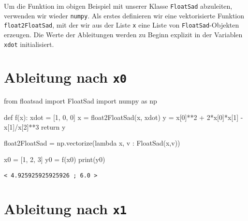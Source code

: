 \documentclass[
  a4paper,
  DIV=11]{scrreprt}
\newenvironment{Shaded}{\begin{snugshade}}{\end{snugshade}}
\newcommand{\BuiltInTok}[1]{\textcolor[rgb]{0.00,0.23,0.31}{#1}}
\newcommand{\ControlFlowTok}[1]{\textcolor[rgb]{0.00,0.23,0.31}{#1}}
\newcommand{\DecValTok}[1]{\textcolor[rgb]{0.68,0.00,0.00}{#1}}
\newcommand{\ImportTok}[1]{\textcolor[rgb]{0.00,0.46,0.62}{#1}}
\newcommand{\KeywordTok}[1]{\textcolor[rgb]{0.00,0.23,0.31}{#1}}
\newcommand{\NormalTok}[1]{\textcolor[rgb]{0.00,0.23,0.31}{#1}}
\newcommand{\OperatorTok}[1]{\textcolor[rgb]{0.37,0.37,0.37}{#1}}
\theoremstyle{definition}
\theoremstyle{definition}
\theoremstyle{remark}
\begin{document}
Um die Funktion im obigen Beispiel mit unserer Klasse \texttt{FloatSad}
abzuleiten, verwenden wir wieder \texttt{numpy}. Als erstes definieren
wir eine vektorisierte Funktion \texttt{float2FloatSad}, mit der wir aus
der Liste \texttt{x} eine Liste von \texttt{FloatSad}-Objekten erzeugen.
Die Werte der Ableitungen werden zu Beginn explizit in der Variablen
\texttt{xdot} initialisiert.

\section{\texorpdfstring{Ableitung nach \texttt{x0}}{Ableitung nach x0}}

\begin{Shaded}
\begin{Highlighting}[]
\ImportTok{from}\NormalTok{ floatsad }\ImportTok{import}\NormalTok{ FloatSad}
\ImportTok{import}\NormalTok{ numpy }\ImportTok{as}\NormalTok{ np}

\KeywordTok{def}\NormalTok{ f(x):}
\NormalTok{    xdot }\OperatorTok{=}\NormalTok{ [}\DecValTok{1}\NormalTok{, }\DecValTok{0}\NormalTok{, }\DecValTok{0}\NormalTok{]}
\NormalTok{    x }\OperatorTok{=}\NormalTok{ float2FloatSad(x, xdot)}
\NormalTok{    y }\OperatorTok{=}\NormalTok{ x[}\DecValTok{0}\NormalTok{]}\OperatorTok{**}\DecValTok{2} \OperatorTok{+} \DecValTok{2}\OperatorTok{*}\NormalTok{x[}\DecValTok{0}\NormalTok{]}\OperatorTok{*}\NormalTok{x[}\DecValTok{1}\NormalTok{] }\OperatorTok{{-}}\NormalTok{ x[}\DecValTok{1}\NormalTok{]}\OperatorTok{/}\NormalTok{x[}\DecValTok{2}\NormalTok{]}\OperatorTok{**}\DecValTok{3}
    \ControlFlowTok{return}\NormalTok{ y}

\NormalTok{float2FloatSad }\OperatorTok{=}\NormalTok{ np.vectorize(}\KeywordTok{lambda}\NormalTok{ x, v : FloatSad(x,v))}

\NormalTok{x0 }\OperatorTok{=}\NormalTok{ [}\DecValTok{1}\NormalTok{, }\DecValTok{2}\NormalTok{, }\DecValTok{3}\NormalTok{]}
\NormalTok{y0 }\OperatorTok{=}\NormalTok{ f(x0)}
\BuiltInTok{print}\NormalTok{(y0)}
\end{Highlighting}
\end{Shaded}

\begin{verbatim}
< 4.925925925925926 ; 6.0 >
\end{verbatim}

\section{\texorpdfstring{Ableitung nach \texttt{x1}}{Ableitung nach x1}}
\end{document}
